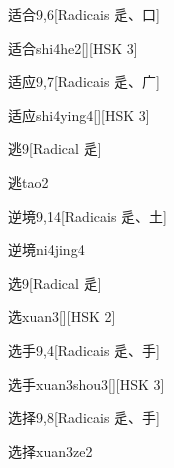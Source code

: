 \begin{entry}{适合}{9,6}[Radicais ⾡、⼝]
  \begin{phonetics}{适合}{shi4he2}[][HSK 3]
  \end{phonetics}
\end{entry}

\begin{entry}{适应}{9,7}[Radicais ⾡、⼴]
  \begin{phonetics}{适应}{shi4ying4}[][HSK 3]
  \end{phonetics}
\end{entry}

\begin{entry}{逃}{9}[Radical ⾡]
  \begin{phonetics}{逃}{tao2}
  \end{phonetics}
\end{entry}

\begin{entry}{逆境}{9,14}[Radicais ⾡、⼟]
  \begin{phonetics}{逆境}{ni4jing4}
  \end{phonetics}
\end{entry}

\begin{entry}{选}{9}[Radical ⾡]
  \begin{phonetics}{选}{xuan3}[][HSK 2]
  \end{phonetics}
\end{entry}

\begin{entry}{选手}{9,4}[Radicais ⾡、⼿]
  \begin{phonetics}{选手}{xuan3shou3}[][HSK 3]
  \end{phonetics}
\end{entry}

\begin{entry}{选择}{9,8}[Radicais ⾡、⼿]
  \begin{phonetics}{选择}{xuan3ze2}
  \end{phonetics}
\end{entry}

